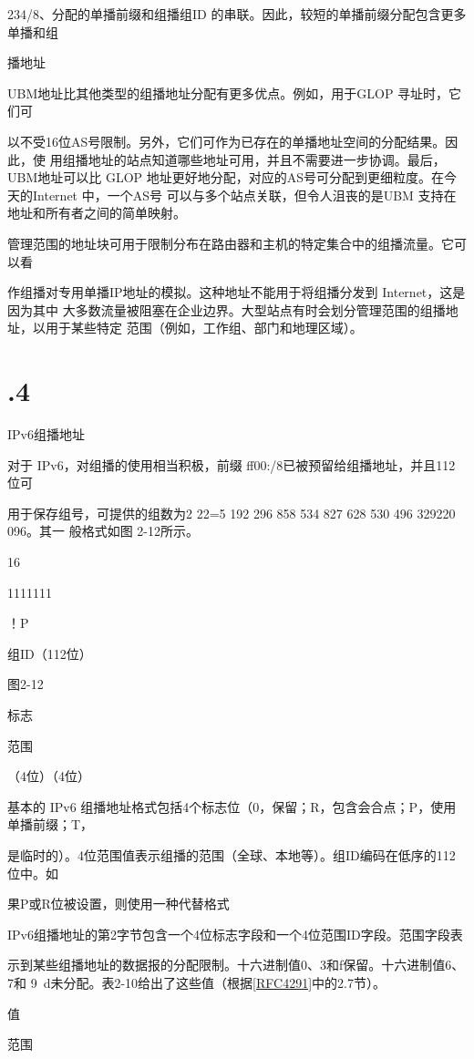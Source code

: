 234/8、分配的单播前缀和组播组ID 的串联。因此，较短的单播前缀分配包含更多单播和组

播地址

UBM地址比其他类型的组播地址分配有更多优点。例如，用于GLOP 寻址时，它们可

以不受16位AS号限制。另外，它们可作为已存在的单播地址空间的分配结果。因此，使
用组播地址的站点知道哪些地址可用，并且不需要进一步协调。最后，UBM地址可以比
GLOP 地址更好地分配，对应的AS号可分配到更细粒度。在今天的Internet 中，一个AS号
可以与多个站点关联，但令人沮丧的是UBM 支持在地址和所有者之间的简单映射。

管理范围的地址块可用于限制分布在路由器和主机的特定集合中的组播流量。它可以看

作组播对专用单播IP地址的模拟。这种地址不能用于将组播分发到 Internet，这是因为其中
大多数流量被阻塞在企业边界。大型站点有时会划分管理范围的组播地址，以用于某些特定
范围（例如，工作组、部门和地理区域）。

\section{.4}
IPv6组播地址

对于 IPv6，对组播的使用相当积极，前缀 ff00:/8已被预留给组播地址，并且112位可

用于保存组号，可提供的组数为2 22=5 192 296 858 534 827 628 530 496 329220 096。其一
般格式如图 2-12所示。

16

1111111

！P

组ID（112位）

图2-12

标志

范围

（4位）（4位）

基本的 IPv6 组播地址格式包括4个标志位（0，保留；R，包含会合点；P，使用单播前缀；T，

是临时的）。4位范围值表示组播的范围（全球、本地等）。组ID编码在低序的112位中。如

果P或R位被设置，则使用一种代替格式

IPv6组播地址的第2字节包含一个4位标志字段和一个4位范围ID字段。范围字段表

示到某些组播地址的数据报的分配限制。十六进制值0、3和f保留。十六进制值6、7和
9~d未分配。表2-10给出了这些值（根据\href{https://www.rfc-editor.org/rfc/rfc4291}{[RFC4291]}中的2.7节）。

值

范围

